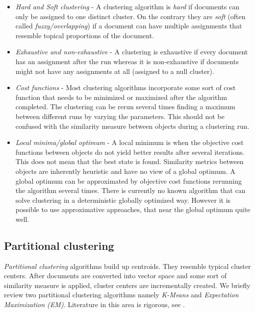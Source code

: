   \begin{itemize}
    \item \emph{Hard and Soft clustering} - A clustering algorithm is \emph{hard} if documents can only be assigned to one distinct cluster. On the contrary they are \emph{soft} (often called \emph{fuzzy/overlapping}) if a document can have multiple assignments that resemble topical proportions of the document.
    \item \emph{Exhaustive and non-exhaustive} - A clustering is exhaustive if every document has an assignment after the run whereas it is non-exhaustive if documents might not have any assignments at all (assigned to a null cluster).
    \item \emph{Cost functions} - Most clustering algorithms incorporate some sort of cost function that needs to be minimized or maximized after the algorithm completed. The clustering can be rerun several times finding a maximum between different runs by varying the parameters. This should not be confused with the similarity measure between objects during a clustering run.
    \item \emph{Local minima/global optimum} - A local minimum is when the objective cost functions between objects do not yield better results after several iterations. This does not mean that the best state is found. Similarity metrics between objects are inherently heuristic and have no view of a global optimum. A global optimum can be approximated by objective cost functions rerunning the algorithm several times. There is currently no known algorithm that can solve clustering in a deterministic globally optimized way. However it is possible to use approximative approaches, that near the global optimum quite well.
  \end{itemize}

  \subsection{Partitional clustering}
  \label{sec:partitional}

    \emph{Partitional clustering} algorithms build up centroids. They resemble typical cluster centers. After documents are converted into vector space and some sort of similarity measure is applied, cluster centers are incrementally created. We briefly review two partitional clustering algorithms namely \emph{K-Means} and \emph{Expectation Maximization (EM)}. Literature in this area is rigorous, see \cite{ClusteringBooAggarwalk2013, NextFrontierClustering2013, IRBookStanford2008}.

